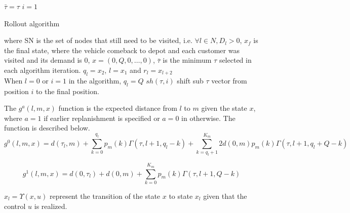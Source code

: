 \begin{algorithm}
$\bar\tau = \tau$\;
$i=1$\;
\caption{Rollout algorithm}\label{algo:rollout1step}
\end{algorithm}

where SN is the set of nodes that still need to be visited, i.e. $\forall l \in N, D_l > 0$, 
$x_f$ is the final state, where the vehicle comeback to depot and each customer was visited and its demand is $0$, $x=(0,Q,0,\ldots,0)$, $\bar\tau$ is the minimum $\tau$ selected in each algorithm iteration.
$q_l = x_2$, $l=x_1$ and $r_l=x_{l+2}$\\
When $l=0$ or $i=1$ in the algorithm, $q_l = Q$
$sh(\tau,i)$ shift sub $\tau$ vector from position $i$ to the final position. 

The $g^a(l,m,x)$ function is the expected distance from $l$ to $m$ given the state $x$, where $a=1$ if earlier replanishment is specified or $a=0$ in otherwise. The function is described below.
\begin{equation}\label{ra:Cost2Go0}
 g^0(l,m,x)=d(\tau_l,m)+\sum_{k=0}^{q_l}p_m(k)\Gamma(\tau,l+1,q_l-k)+\sum_{k=q_l+1}^{K_m}2d(0,m)p_m(k)\Gamma(\tau,l+1,q_l+Q-k)%
\end{equation}

\begin{equation}\label{ra:Cost2Go1}
 g^1(l,m,x)=d(0,\tau_l)+d(0,m)+\sum_{k=0}^{K_m}p_m(k)\Gamma(\tau,l+1,Q-k)
\end{equation}


$x_l = \Upsilon(x,u)$ represent the transition of the state $x$ to state $x_l$ given that the control $u$ is realized.





